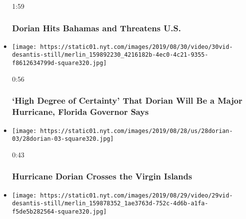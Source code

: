 \begin{itemize}
  1:59

  \hypertarget{dorian-hits-bahamas-and-threatens-us}{%
  \subsubsection{Dorian Hits Bahamas and Threatens
  U.S.}\label{dorian-hits-bahamas-and-threatens-us}}
\item
  \href{https://www.nytimes.com/video/us/100000006690229/hurricane-dorian-desantis.html?action=click\&module=video-series-bar\&region=header\&pgtype=Article\&playlistId=video/extreme-weather}{}

  \texttt{[image: https://static01.nyt.com/images/2019/08/30/video/30vid-desantis-still/merlin\_159892230\_4216182b-4ec0-4c21-9355-f8612634799d-square320.jpg]}

  0:56

  \hypertarget{high-degree-of-certainty-that-dorian-will-be-a-major-hurricane-florida-governor-says}{%
  \subsubsection{`High Degree of Certainty' That Dorian Will Be a Major
  Hurricane, Florida Governor
  Says}\label{high-degree-of-certainty-that-dorian-will-be-a-major-hurricane-florida-governor-says}}
\item
  \href{https://www.nytimes.com/video/climate/100000006687979/hurricane-dorian-virgin-islands.html?action=click\&module=video-series-bar\&region=header\&pgtype=Article\&playlistId=video/extreme-weather}{}

  \texttt{[image: https://static01.nyt.com/images/2019/08/28/us/28dorian-03/28dorian-03-square320.jpg]}

  0:43

  \hypertarget{hurricane-dorian-crosses-the-virgin-islands}{%
  \subsubsection{Hurricane Dorian Crosses the Virgin
  Islands}\label{hurricane-dorian-crosses-the-virgin-islands}}
\item
  \href{https://www.nytimes.com/video/us/100000006688013/hurricane-dorian-preparations.html?action=click\&module=video-series-bar\&region=header\&pgtype=Article\&playlistId=video/extreme-weather}{}

  \texttt{[image: https://static01.nyt.com/images/2019/08/29/video/29vid-desantis-still/merlin\_159878352\_1ae3763d-752c-4d6b-a1fa-f5de5b282564-square320.jpg]}


\end{itemize}
